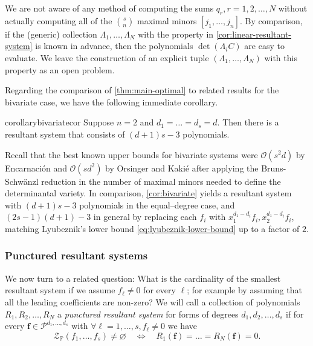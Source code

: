 \documentclass[11pt,a4paper]{article}
\numberwithin{equation}{section}
\newcommand{\PP}{\mathbb{P}}
\newcommand{\cP}{\mathcal{P}}
\newcommand{\cZ}{\mathcal{Z}}
\newcommand{\cO}{\mathcal{O}}
\newcommand{\ff}{\ensuremath{\boldsymbol{f}}}
\begin{document}
We are not aware of any method of computing the sums $q_r, r=1,2,\dots,N$ without actually computing all of the $\binom{s}{n}$ maximal minors $[j_1,\dots,j_n]$.
By comparison, if the (generic) collection $\Lambda_1,\dots,\Lambda_N$ with the property in \cref{cor:linear-resultant-system} is known in advance, then the polynomials $\det(\Lambda_i C)$ are easy to evaluate. 
We leave the construction of an explicit tuple $(\Lambda_1,\dots,\Lambda_N)$ with this property as an open problem.


Regarding the comparison of \cref{thm:main-optimal} 
to related results for the bivariate case, we have the following immediate corollary.
\begin{restatable}{corollary}{bivariatecor}
\label{cor:bivariate}
    Suppose $n=2$ and $d_1=\dots=d_s=d$. Then there is a resultant system that consists of $(d+1)s-3$ polynomials.
\end{restatable}
\noindent
Recall that the best known upper bounds for bivariate systems were $\cO(s^2d)$ by Encarnaci\'{o}n \cite{Encarnacion-98} and $\cO(sd^2)$ by Orsinger \cite{Orsinger-51} and Kaki\'{e} \cite{Kakie-76} after applying the Bruns-Schw\"{a}nzl reduction in the number of maximal minors needed to define the determinantal variety.
In comparison, \cref{cor:bivariate} yields a resultant system with $(d+1)s-3$ polynomials in the equal--degree case, and $(2s-1)(d+1)-3$ in general by replacing each $f_i$ with $x_1^{d_1-d_i}f_i, x_2^{d_1-d_i}f_i$, matching Lyubeznik's lower bound \eqref{eq:lyubeznik-lower-bound} up to a factor of $2$. 


\subsubsection{Punctured resultant systems}
We now turn to a related question:
What is the cardinality of the smallest resultant system if we assume $f_\ell\neq 0$ for every $\ell$;
for example by assuming that all the leading coefficients  are non-zero?
We will call a collection of polynomials $R_1,R_2,\dots,R_{N}$ a \emph{punctured resultant system} for forms of degrees $d_1,d_2,\dots,d_s$ if for every $\ff\in\cP^{d_1,\dots,d_s}$ with $\forall \ell=1,\dots,s, f_\ell\neq 0$ we have \[
\cZ_{\PP}(f_1,\dots,f_s)\neq\varnothing\quad\iff\quad R_1(\ff)=\dots=R_N(\ff)=0.
\]
\end{document}

